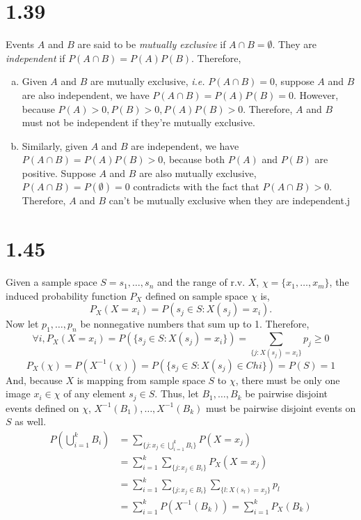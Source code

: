 \documentclass[letterpaper]{article}
\begin{document}
    \section*{1.39}
    Events $A$ and $B$ are said to be \emph{mutually exclusive} if $A \cap B = \emptyset$. They are \emph{independent} if $P(A\cap B) = P(A)P(B)$.
    Therefore,
    \begin{enumerate}[(a)]
        \item Given $A$ and $B$ are mutually exclusive, \emph{i.e.} $P(A \cap B) = 0$, suppose $A$ and $B$ are also independent, we have $P(A \cap B) = P(A)P(B) = 0$. However, because $P(A) > 0, P(B) > 0, P(A)P(B) > 0$. Therefore, $A$ and $B$ must not be independent if they're mutually exclusive.
        \item Similarly, given $A$ and $B$ are independent, we have $P(A \cap B) = P(A)P(B) > 0$, because both $P(A)$ and $P(B)$ are positive. Suppose $A$ and $B$ are also mutually exclusive, $P(A \cap B) = P(\emptyset) = 0$ contradicts with the fact that $P(A \cap B) > 0$. Therefore, $A$ and $B$ can't be mutually exclusive when they are independent.j
    \end{enumerate}
    \section*{1.45}
    Given a sample space $S= {s_1, \dots, s_n}$ and the range of r.v. $X$,
    $\chi = \{x_1, \dots, x_m\}$,
    the induced probability function $P_X$ defined on sample space $\chi$ is,
    \[
    P_X(X = x_i) = P({s_j \in S: X(s_j)=x_i}).
    \]
    Now let $p_1, \dots, p_n$ be nonnegative numbers that sum up to 1. 
    Therefore, 
    \[
    \forall i, P_X(X=x_i) = P(\{s_j \in S: X(s_j) = x_i\}) = \sum_{\{j:
    X(s_j) = x_i\}} p_j \geq 0
    \]
    \[
    P_X(\chi) = P(X^{-1}(\chi)) = P(\{s_j \in S: X(s_j) \in Chi\}) = P(S) = 1
    \]
    And, because $X$ is mapping from sample space $S$ to $\chi$, there must be
    only one image $x_i \in \chi$ of any element $s_j \in S$. Thus, let 
    $B_1, \dots, B_k$ be pairwise disjoint events defined on $\chi$, 
    $X^{-1}(B_1), \dots, X^{-1}(B_k)$ must be pairwise disjoint events on $S$
    as well. 
    \begin{align*}
    P(\bigcup_{i=1}^k B_i) & = \sum_{\{j:x_j \in \bigcup_{i=1}^k B_i\}} P(X=x_j)
    \\
    & = \sum_{i=1}^k \sum_{\{j:x_j \in B_i \}} P_X(X=x_j) \\
    & = \sum_{i=1}^k \sum_{\{j:x_j \in B_i \}} \sum_{\{l: X(s_l)
    = x_j\}} p_l \\
    & = \sum_{i=1}^k P(X^{-1}(B_k)) = \sum_{i=1}^k P_X(B_k)
    \end{align*}
    
\end{document}
